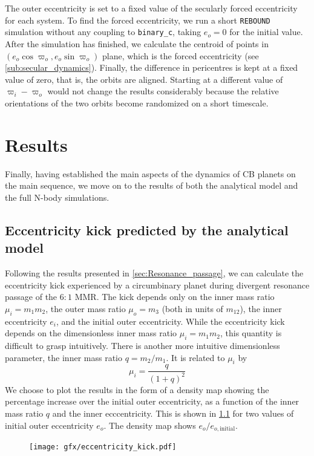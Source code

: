 \documentclass[ twoside,openright,titlepage,numbers=noenddot,headinclude,%
                footinclude=true,cleardoublepage=empty,abstractoff, %
                BCOR=5mm,paper=a4,fontsize=11pt,%
                american,%
                ]{scrreprt}
\begin{document}
The outer eccentricity is set to a fixed value of the secularly forced 
eccentricity for each system. To find the forced eccentricity, we 
run a short \texttt{REBOUND} simulation without any coupling to 
\texttt{binary\_c}, taking $e_o=0$ for the initial value. After the 
simulation has finished, we calculate the centroid of points in 
$(e_o\cos\varpi_o,e_o\sin\varpi_o)$ plane, which is the forced eccentricity
(see \cref{sub:secular_dynamics}). Finally, the difference in pericentres
is kept at a fixed value of zero, that is, the orbits are aligned. Starting
at a different value of $\varpi_i-\varpi_o$ would not change the results 
considerably
because the relative orientations of the two orbits become randomized on a short 
timescale.
\clearpage
\chapter{Results}
\label{ch:results}
Finally, having established the main aspects of the dynamics
of CB planets on the main sequence, we move on to
the results of both the analytical model and the full 
N-body simulations.

\section{Eccentricity kick predicted by the analytical model}
\label{sec:Simulations with a single planet}
Following the results presented in \cref{sec:Resonance_passage}, we can 
calculate the eccentricity kick experienced by a circumbinary planet
during divergent resonance passage of the $6:1$ MMR. The kick depends only on
the inner mass ratio $\mu_i=m_1m_2$, the outer mass ratio $\mu_o=m_3$ 
(both in units of $m_{12}$), the inner eccentricity $e_i$, and the initial 
outer eccentricity.
While the eccentricity kick depends on the dimensionless inner mass ratio
$\mu_i=m_1m_2$, this quantity is difficult to grasp intuitively. There 
is another more
intuitive dimensionless parameter, the inner mass ratio $q=m_2/m_1$. It is
related to $\mu_i$ by
\begin{equation}
    \mu_i = \frac{q}{(1 +q)^2} 
\end{equation}
We choose to plot the results in the form of a 
density map showing the percentage increase over the initial outer eccentricity, as
a function of the inner mass ratio $q$ and the inner ecccentricity.
This is shown in \cref{fig:eccentricity_kick} for two values of initial outer 
eccentricity $e_o$. The density map shows $e_o/e_{o,\text{initial}}$.
\begin{figure}[htb]
\centering
\texttt{[image: gfx/eccentricity\_kick.pdf]}
\caption{}
\label{fig:eccentricity_kick}
\end{figure}
\end{document}
